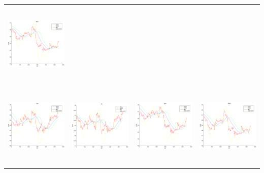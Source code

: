 \begin{tabular}{ |c|c|c|c| }
\includegraphics[width=4.0cm,height=4.0cm]{images/RealTimeFinancialTSMining/klTimeSeries/RDCFilteredPriceSeries.pdf}   \\
\includegraphics[width=4.0cm,height=4.0cm]{images/RealTimeFinancialTSMining/klTimeSeries/RIGFilteredPriceSeries.pdf}   &
\includegraphics[width=4.0cm,height=4.0cm]{images/RealTimeFinancialTSMining/klTimeSeries/SIIFilteredPriceSeries.pdf}   &
\includegraphics[width=4.0cm,height=4.0cm]{images/RealTimeFinancialTSMining/klTimeSeries/SLBFilteredPriceSeries.pdf}   &
\includegraphics[width=4.0cm,height=4.0cm]{images/RealTimeFinancialTSMining/klTimeSeries/TDWFilteredPriceSeries.pdf}
\end{tabular}
